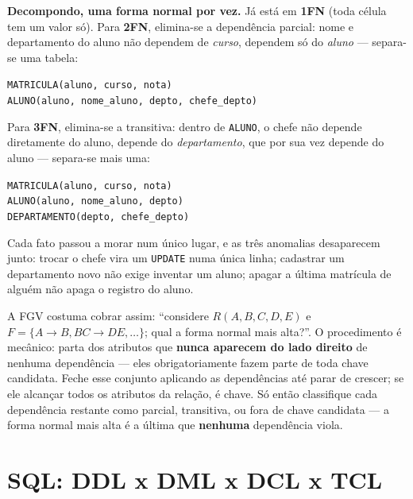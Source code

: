 \begin{exemplo}
\textbf{Decompondo, uma forma normal por vez.} Já está em \textbf{1FN}
(toda célula tem um valor só). Para \textbf{2FN}, elimina-se a
dependência parcial: nome e departamento do aluno não dependem de
\textit{curso}, dependem só do \textit{aluno} --- separa-se uma tabela:

\begin{center}
\texttt{MATRICULA(aluno, curso, nota)}\\
\texttt{ALUNO(aluno, nome\_aluno, depto, chefe\_depto)}
\end{center}

Para \textbf{3FN}, elimina-se a transitiva: dentro de \texttt{ALUNO}, o
chefe não depende diretamente do aluno, depende do \textit{departamento},
que por sua vez depende do aluno --- separa-se mais uma:

\begin{center}
\texttt{MATRICULA(aluno, curso, nota)}\\
\texttt{ALUNO(aluno, nome\_aluno, depto)}\\
\texttt{DEPARTAMENTO(depto, chefe\_depto)}
\end{center}

Cada fato passou a morar num único lugar, e as três anomalias
desaparecem junto: trocar o chefe vira um \texttt{UPDATE} numa única
linha; cadastrar um departamento novo não exige inventar um aluno; apagar
a última matrícula de alguém não apaga o registro do aluno.
\end{exemplo}

\begin{regrapratica}
A FGV costuma cobrar assim: “considere $R(A,B,C,D,E)$ e $F = \{A \to B,
BC \to DE, \ldots\}$; qual a forma normal mais alta?”. O procedimento é
mecânico: parta dos atributos que \textbf{nunca aparecem do lado direito}
de nenhuma dependência --- eles obrigatoriamente fazem parte de toda chave
candidata. Feche esse conjunto aplicando as dependências até parar de
crescer; se ele alcançar todos os atributos da relação, é chave. Só então
classifique cada dependência restante como parcial, transitiva, ou fora de
chave candidata --- a forma normal mais alta é a última que \textbf{nenhuma}
dependência viola.
\end{regrapratica}

\section{SQL: DDL x DML x DCL x TCL}

